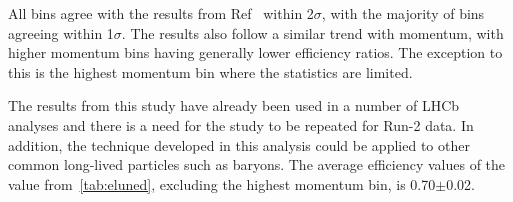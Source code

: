 All bins agree with the results from Ref~\cite{DDpat} within 2$\sigma$, with the majority of bins agreeing within 1$\sigma$. The results also follow a similar trend with momentum, with higher momentum bins having generally lower efficiency ratios. The exception to this is the highest momentum bin where the statistics are limited.

The results from this study have already been used in a number of LHCb analyses and there is a need for the study to be repeated for Run-2 data. In addition, the technique developed in this analysis could be applied to other common long-lived particles such as \Lz baryons. The average efficiency values of the value from~\autoref{tab:eluned}, excluding the highest momentum bin, is 0.70$\pm$0.02.





